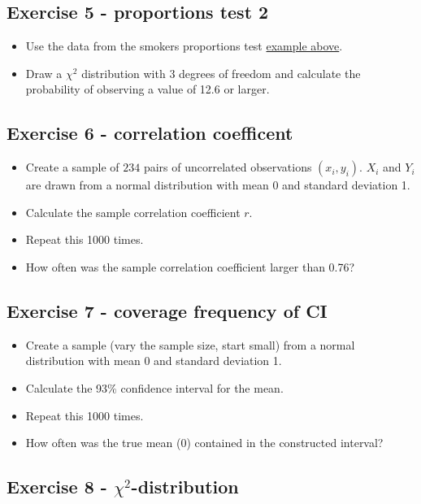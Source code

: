 \documentclass[
]{book}
\providecommand{\tightlist}{%
  \setlength{\itemsep}{0pt}\setlength{\parskip}{0pt}}
\begin{document}
\subsection{Exercise 5 - proportions test 2}\label{exercise5_nhst}

\begin{itemize}
\tightlist
\item
  Use the data from the smokers proportions test \hyperref[proportions_test_more_samples]{example above}.
\item
  Draw a \(\chi^2\) distribution with 3 degrees of freedom and calculate the
  probability of observing a value of 12.6 or larger.
\end{itemize}

\subsection{Exercise 6 - correlation coefficent}\label{exercise6_nhst}

\begin{itemize}
\tightlist
\item
  Create a sample of \(234\) pairs of uncorrelated observations \((x_i,y_i)\).
  \(X_i\) and \(Y_i\) are drawn from a normal distribution with mean 0 and standard deviation 1.
\item
  Calculate the sample correlation coefficient \(r\).
\item
  Repeat this 1000 times.
\item
  How often was the sample correlation coefficient larger than 0.76?
\end{itemize}

\subsection{Exercise 7 - coverage frequency of CI}\label{exercise7_nhst}

\begin{itemize}
\tightlist
\item
  Create a sample (vary the sample size, start small) from a normal distribution with mean 0 and standard deviation 1.
\item
  Calculate the 93\% confidence interval for the mean.
\item
  Repeat this 1000 times.
\item
  How often was the true mean (0) contained in the constructed interval?
\end{itemize}

\subsection{\texorpdfstring{Exercise 8 - \(\chi^2\)-distribution}{Exercise 8 - \textbackslash chi\^{}2-distribution}}\label{exercise8_nhst}
\end{document}
